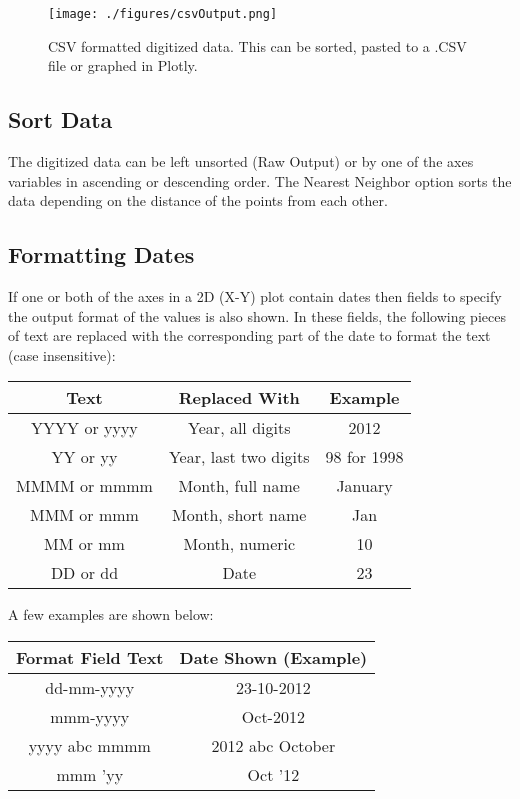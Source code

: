 \documentclass[letterpaper, 10pt]{article}
\begin{document}
\begin{figure}
\begin{center}
\texttt{[image: ./figures/csvOutput.png]}
\caption{CSV formatted digitized data. This can be sorted, pasted to a .CSV file or graphed in Plotly.}
\label{fig:csvOutput}
\end{center}
\end{figure}
\subsection{Sort Data}
The digitized data can be left unsorted (Raw Output) or by one of the axes variables in ascending or descending order. The Nearest Neighbor option sorts the data depending on the distance of the points from each other.
\subsection{Formatting Dates}
If one or both of the axes in a 2D (X-Y) plot contain dates then fields to specify the output format of the values is also shown. In these fields, the following pieces of text are replaced with the corresponding part of the date to format the text (case insensitive):

\begin{center}
\begin{tabular}{|c|c|c|}
\hline
Text & Replaced With & Example\\
\hline
YYYY or yyyy & Year, all digits & 2012\\
YY or yy & Year, last two digits & 98 for 1998\\
MMMM or mmmm & Month, full name & January\\
MMM or mmm & Month, short name & Jan\\
MM or mm & Month, numeric & 10\\
DD or dd & Date & 23\\
\hline
\end{tabular}
\end{center}

A few examples are shown below:

\begin{center}
\begin{tabular}{|c|c|}
\hline
Format Field Text & Date Shown (Example)\\
\hline
dd-mm-yyyy & 23-10-2012\\
mmm-yyyy & Oct-2012\\
yyyy abc mmmm & 2012 abc October\\
mmm 'yy & Oct '12\\
\hline
\end{tabular}
\end{center}
\end{document}
